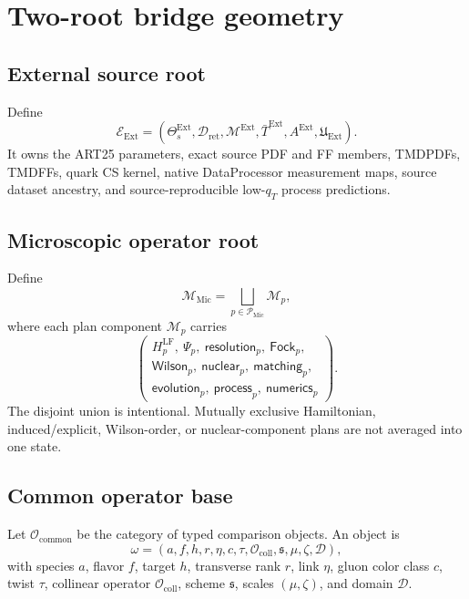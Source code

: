 \documentclass[11pt]{article}
\newcommand{\LF}{\ensuremath{\mathrm{LF}}}
\newcommand{\cO}{\mathcal O}
\newcommand{\cM}{\mathcal M}
\newcommand{\cD}{\mathcal D}
\newcommand{\cE}{\mathcal E}
\newcommand{\cP}{\mathcal P}
\newcommand{\Ext}{\ensuremath{\mathrm{Ext}}}
\newcommand{\Mic}{\ensuremath{\mathrm{Mic}}}
\begin{document}
\section{Two-root bridge geometry}
\label{sec:two-roots}

\subsection{External source root}

Define
\begin{equation}
 \cE_{\Ext}
 =
 \left(
 \Theta_s^{\Ext},
 \cD_{\mathrm{ret}},
 \cM^{\Ext},
 \bar T^{\Ext},
 A^{\Ext},
 \mathfrak U_{\Ext}
 \right).
 \label{eq:external-root}
\end{equation}
It owns the ART25 parameters, exact source PDF and FF members, TMDPDFs, TMDFFs, quark CS kernel, native DataProcessor measurement maps, source dataset ancestry, and source-reproducible low-\(q_T\) process predictions.

\subsection{Microscopic operator root}

Define
\begin{equation}
 \cM_{\Mic}
 =
 \bigsqcup_{p\in\cP_{\Mic}}
 \cM_p,
 \label{eq:microscopic-root}
\end{equation}
where each plan component \(\cM_p\) carries
\begin{equation}
 \left(
 \begin{gathered}
 H_p^{\LF},\ \Psi_p,\ \mathsf{resolution}_p,\ \mathsf{Fock}_p,\\
 \mathsf{Wilson}_p,\ \mathsf{nuclear}_p,\ \mathsf{matching}_p,\\
 \mathsf{evolution}_p,\ \mathsf{process}_p,\ \mathsf{numerics}_p
 \end{gathered}
 \right).
 \label{eq:microscopic-plan}
\end{equation}
The disjoint union is intentional.  Mutually exclusive Hamiltonian, induced/explicit, Wilson-order, or nuclear-component plans are not averaged into one state.

\subsection{Common operator base}

Let \(\cO_{\mathrm{common}}\) be the category of typed comparison objects.  An object is
\begin{equation}
 \omega
 =
 \left(
 a,f,h,r,\eta,c,\tau,\cO_{\mathrm{coll}},\mathfrak s,\mu,\zeta,\mathcal D
 \right),
 \label{eq:operator-identity}
\end{equation}
with species \(a\), flavor \(f\), target \(h\), transverse rank \(r\), link \(\eta\), gluon color class \(c\), twist \(\tau\), collinear operator \(\cO_{\mathrm{coll}}\), scheme \(\mathfrak s\), scales \((\mu,\zeta)\), and domain \(\mathcal D\).
\end{document}
